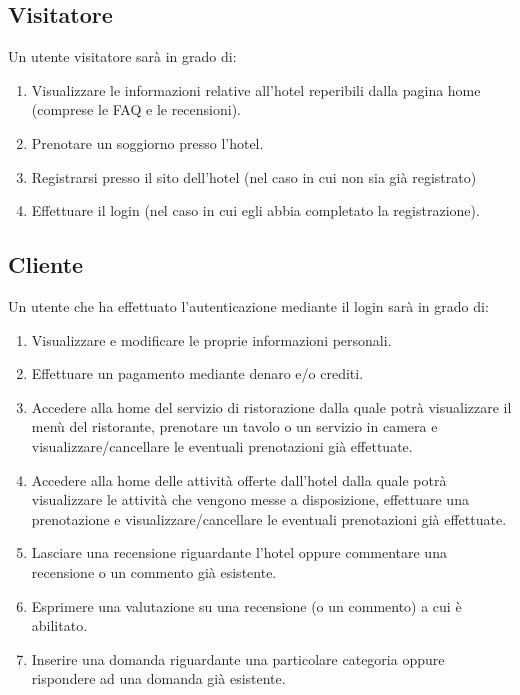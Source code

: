 \documentclass [a4paper, 12pt]{book}
\begin{document}
\subsection{Visitatore}
Un utente visitatore sarà in grado di:
\begin{enumerate}
\item Visualizzare le informazioni relative all'hotel reperibili dalla pagina home (comprese le FAQ e le recensioni).
\item Prenotare un soggiorno presso l'hotel.
\item Registrarsi presso il sito dell'hotel (nel caso in cui non sia già registrato)
\item Effettuare il login (nel caso in cui egli abbia completato la registrazione).
\end{enumerate}

\medskip

\subsection{Cliente}
Un utente che ha effettuato l'autenticazione mediante il login sarà in grado di:
\begin{enumerate}
\item Visualizzare e modificare le proprie informazioni personali.
\item Effettuare un pagamento mediante denaro e/o crediti.
\item Accedere alla home del servizio di ristorazione dalla quale potrà visualizzare il menù del ristorante, prenotare un tavolo o un servizio in camera e visualizzare/cancellare le eventuali prenotazioni già effettuate.
\item Accedere alla home delle attività offerte dall'hotel dalla quale potrà visualizzare le attività che vengono messe a disposizione, effettuare una prenotazione e visualizzare/cancellare le eventuali prenotazioni già effettuate.
\item Lasciare una recensione riguardante l'hotel oppure commentare una recensione o un commento già esistente.
\item Esprimere una valutazione su una recensione (o un commento) a cui è abilitato.
\item Inserire una domanda riguardante una particolare categoria oppure rispondere ad una domanda già esistente.
\end{enumerate}

\medskip
\end{document}
